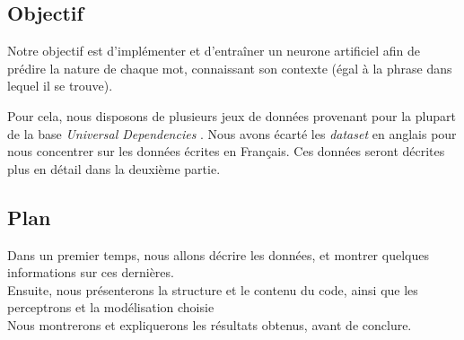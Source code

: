 \subsection{Objectif}
Notre objectif est d'implémenter et d'entraîner
un neurone artificiel afin de prédire
la nature de chaque mot, connaissant son contexte
(égal à la phrase dans lequel il se trouve).


Pour cela, nous disposons de plusieurs jeux de données provenant pour
la plupart de la base \emph{ Universal Dependencies }. Nous avons
écarté les \emph{dataset} en anglais pour nous concentrer sur les
données écrites en Français. Ces données seront décrites plus en
détail dans la deuxième partie.


\subsection{Plan}
Dans un premier temps, nous allons décrire les données, et montrer
quelques informations sur ces dernières. \\
Ensuite, nous présenterons la structure et le contenu du code, ainsi
que les perceptrons et la modélisation choisie \\
Nous montrerons et expliquerons les résultats obtenus,
avant de conclure.


